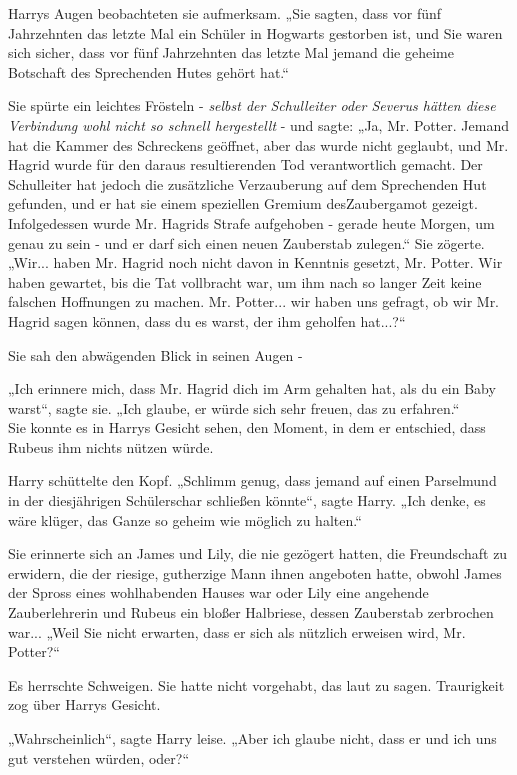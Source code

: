 {Harrys Augen beobachteten sie aufmerksam. „Sie sagten, dass vor fünf Jahrzehnten das letzte Mal ein Schüler in Hogwarts gestorben ist, und Sie waren sich sicher, dass vor fünf Jahrzehnten das letzte Mal jemand die geheime Botschaft des Sprechenden Hutes gehört hat.“

Sie spürte ein leichtes Frösteln - \emph{selbst der Schulleiter oder Severus hätten diese Verbindung wohl nicht so schnell hergestellt} - und sagte: „Ja, Mr. Potter. Jemand hat die Kammer des Schreckens geöffnet, aber das wurde nicht geglaubt, und Mr. Hagrid wurde für den daraus resultierenden Tod verantwortlich gemacht. Der Schulleiter hat jedoch die zusätzliche Verzauberung auf dem Sprechenden Hut gefunden, und er hat sie einem speziellen Gremium desZaubergamot gezeigt. Infolgedessen wurde Mr. Hagrids Strafe aufgehoben - gerade heute Morgen, um genau zu sein - und er darf sich einen neuen Zauberstab zulegen.“ Sie zögerte. „Wir... haben Mr. Hagrid noch nicht davon in Kenntnis gesetzt, Mr. Potter. Wir haben gewartet, bis die Tat vollbracht war, um ihm nach so langer Zeit keine falschen Hoffnungen zu machen. Mr. Potter... wir haben uns gefragt, ob wir Mr. Hagrid sagen können, dass du es warst, der ihm geholfen hat...?“

Sie sah den abwägenden Blick in seinen Augen -

„Ich erinnere mich, dass Mr. Hagrid dich im Arm gehalten hat, als du ein Baby warst“, sagte sie. „Ich glaube, er würde sich sehr freuen, das zu erfahren.“\\ Sie konnte es in Harrys Gesicht sehen, den Moment, in dem er entschied, dass Rubeus ihm nichts nützen würde.

Harry schüttelte den Kopf. „Schlimm genug, dass jemand auf einen Parselmund in der diesjährigen Schülerschar schließen könnte“, sagte Harry. „Ich denke, es wäre klüger, das Ganze so geheim wie möglich zu halten.“

Sie erinnerte sich an James und Lily, die nie gezögert hatten, die Freundschaft zu erwidern, die der riesige, gutherzige Mann ihnen angeboten hatte, obwohl James der Spross eines wohlhabenden Hauses war oder Lily eine angehende Zauberlehrerin und Rubeus ein bloßer Halbriese, dessen Zauberstab zerbrochen war... „Weil Sie nicht erwarten, dass er sich als nützlich erweisen wird, Mr. Potter?“

Es herrschte Schweigen. Sie hatte nicht vorgehabt, das laut zu sagen. Traurigkeit zog über Harrys Gesicht.

„Wahrscheinlich“, sagte Harry leise. „Aber ich glaube nicht, dass er und ich uns gut verstehen würden, oder?“

}
